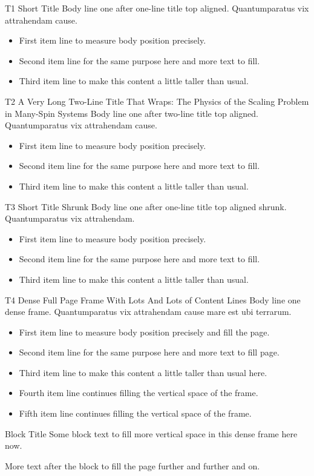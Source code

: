 \documentclass[aspectratio=169]{beamer}
\begin{document}
\begin{frame}[t]{T1 Short Title}
Body line one after one-line title top aligned. Quantumparatus vix attrahendam cause.
\begin{itemize}
\item First item line to measure body position precisely.
\item Second item line for the same purpose here and more text to fill.
\item Third item line to make this content a little taller than usual.
\end{itemize}
\end{frame}

\begin{frame}[t]{T2 A Very Long Two-Line Title That Wraps: The Physics of the Scaling Problem in Many-Spin Systems}
Body line one after two-line title top aligned. Quantumparatus vix attrahendam cause.
\begin{itemize}
\item First item line to measure body position precisely.
\item Second item line for the same purpose here and more text to fill.
\item Third item line to make this content a little taller than usual.
\end{itemize}
\end{frame}

\begin{frame}[t][shrink=15]{T3 Short Title Shrunk}
Body line one after one-line title top aligned shrunk. Quantumparatus vix attrahendam.
\begin{itemize}
\item First item line to measure body position precisely.
\item Second item line for the same purpose here and more text to fill.
\item Third item line to make this content a little taller than usual.
\end{itemize}
\end{frame}

\begin{frame}[t]{T4 Dense Full Page Frame With Lots And Lots of Content Lines}
Body line one dense frame. Quantumparatus vix attrahendam cause mare est ubi terrarum.
\begin{itemize}
\item First item line to measure body position precisely and fill the page.
\item Second item line for the same purpose here and more text to fill page.
\item Third item line to make this content a little taller than usual here.
\item Fourth item line continues filling the vertical space of the frame.
\item Fifth item line continues filling the vertical space of the frame.
\end{itemize}
\begin{block}{Block Title}
Some block text to fill more vertical space in this dense frame here now.
\end{block}
More text after the block to fill the page further and further and on.
\end{frame}
\end{document}
